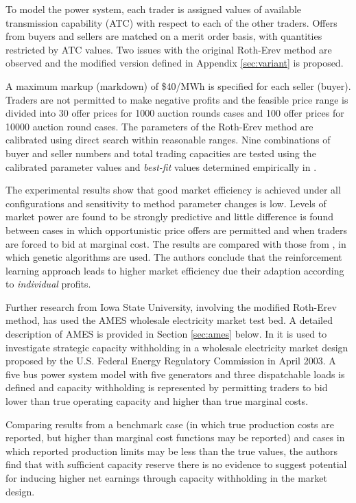 To model the power system, each trader is assigned values of available
transmission capability (ATC) with respect to each of the other traders.
Offers from buyers and sellers are matched on a merit order basis, with quantities restricted by
ATC values.  Two issues with the original Roth-Erev method are observed and
the modified version defined in Appendix \ref{sec:variant} is proposed.

A maximum markup (markdown) of \$40/MWh is specified for each seller (buyer).
Traders are not permitted to make negative profits and the feasible price range
is divided into 30 offer prices for 1000 auction rounds cases and 100 offer
prices for 10000 auction round cases.  The parameters of the Roth-Erev method
are calibrated using direct search within reasonable ranges.  Nine combinations of
buyer and seller numbers and total trading capacities are tested using the
calibrated parameter values and \textit{best-fit} values determined
empirically in .

The experimental results show that good market efficiency is achieved under all
configurations and sensitivity to method parameter changes is low.  Levels of
market power are found to be strongly predictive and little difference is found
between cases in which opportunistic price offers are permitted and when traders
are forced to bid at marginal cost.  The results are compared with those from
, in which genetic algorithms are used.  The authors
conclude that the reinforcement learning approach leads to higher market
efficiency due their adaption according to \textit{individual} profits.

Further research from Iowa State University, involving the modified Roth-Erev
method, has used the AMES wholesale electricity market test bed.  A
detailed description of AMES is provided in Section \ref{sec:ames} below.  In
 it is used to investigate strategic capacity
withholding in a wholesale electricity market design proposed by the U.S.
Federal Energy Regulatory Commission in April 2003.  A five bus power system model
with five generators and three dispatchable loads is defined and capacity
withholding is represented by permitting traders to bid lower than true
operating capacity and higher than true marginal costs.

Comparing results from a benchmark case (in which true production costs are
reported, but higher than marginal cost functions may be reported) and cases in
which reported production limits may be less than the true values, the authors
find that with sufficient capacity reserve there is no evidence to suggest
potential for inducing higher net earnings through capacity withholding in the
market design.

